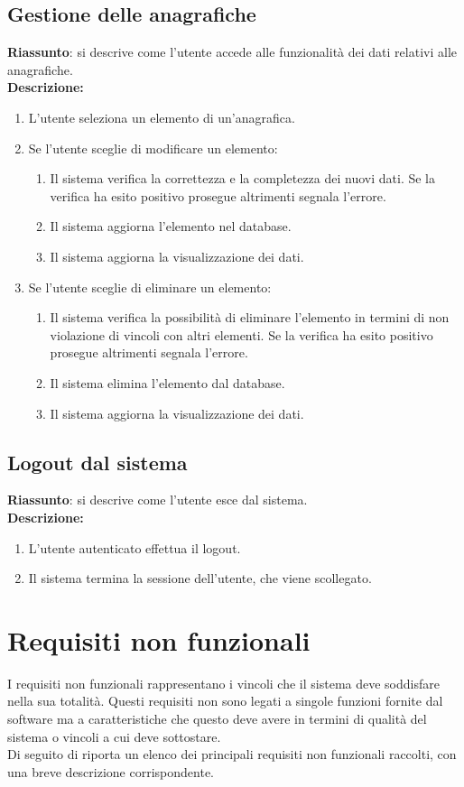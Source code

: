 \subsection{Gestione delle anagrafiche}
\textbf{Riassunto}: si descrive come l'utente accede alle funzionalità dei dati relativi alle anagrafiche.\\
\textbf{Descrizione:}
\begin{enumerate}
  \item L'utente seleziona un elemento di un'anagrafica.
  \item Se l'utente sceglie di modificare un elemento:
  \begin{enumerate}
    \item Il sistema verifica la correttezza e la completezza dei nuovi dati. Se la verifica ha esito positivo prosegue altrimenti segnala l'errore.
    \item Il sistema aggiorna l'elemento nel database.
    \item Il sistema aggiorna la visualizzazione dei dati.
  \end{enumerate}
  \item Se l'utente sceglie di eliminare un elemento:
  \begin{enumerate}
    \item Il sistema verifica la possibilità di eliminare l'elemento in termini di non violazione di vincoli con altri elementi. Se la verifica ha esito positivo prosegue altrimenti segnala l'errore.
    \item Il sistema elimina l'elemento dal database.
    \item Il sistema aggiorna la visualizzazione dei dati.
  \end{enumerate}
\end{enumerate}

\subsection{Logout dal sistema}
\textbf{Riassunto}: si descrive come l'utente esce dal sistema.\\
\textbf{Descrizione:}
\begin{enumerate}
  \item L'utente autenticato effettua il logout.
  \item Il sistema termina la sessione dell'utente, che viene scollegato.
\end{enumerate}



\section{Requisiti non funzionali}
\label{sec:nonfunzionali}
I requisiti non funzionali rappresentano i vincoli che il sistema deve soddisfare nella sua totalità. Questi requisiti non sono legati a singole funzioni fornite dal software ma a caratteristiche che questo deve avere in termini di qualità del sistema o vincoli a cui deve sottostare.\\
Di seguito di riporta un elenco dei principali requisiti non funzionali raccolti, con una breve descrizione corrispondente.

